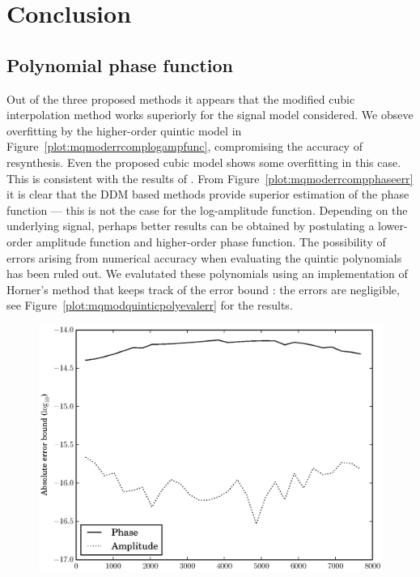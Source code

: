 \section{Conclusion}

\subsection{Polynomial phase function}

Out of the three proposed methods it appears that the modified cubic
interpolation method works superiorly for the signal model considered. We obseve
overfitting by the higher-order quintic model in
Figure~\ref{plot:mqmoderrcomplogampfunc}, compromising the accuracy of
resynthesis.  Even the proposed cubic model shows some overfitting in this case.
This is consistent with the results of \cite{girin2003comparing}. From
Figure~\ref{plot:mqmoderrcompphaseerr} it is clear that the DDM based methods
provide superior estimation of the phase function --- this is not the case for
the log-amplitude function. Depending on the underlying signal, perhaps better
results can be obtained by postulating a lower-order amplitude function and
higher-order phase function. The possibility of errors arising from numerical
accuracy when evaluating the quintic polynomials has been ruled out.  We
evalutated these polynomials using an implementation of Horner's method that
keeps track of the error bound \cite[p.~95]{higham2002accuracy}: the errors are
negligible, see Figure~\ref{plot:mqmodquinticpolyevalerr} for the results.

\begin{figure}[!t]
    \centering
    \includegraphics[width=\figwidthscale\textwidth]{plots/mq_mod_quintic_poly_eval_err.eps}
\end{figure}

